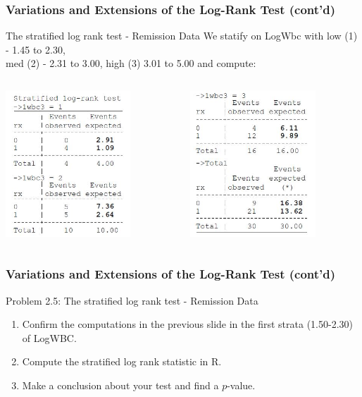\documentclass{beamer}
\theoremstyle{definition}
\begin{document}
\begin{frame}
\frametitle{Variations and Extensions of the Log-Rank Test (cont'd)}
\begin{block}{The stratified log rank test - Remission Data}
We statify on LogWbc with low (1) - 1.45 to 2.30, \\ med (2) - 2.31 to 3.00, high (3) 3.01 to 5.00 and compute:
\begin{columns}
    \begin{column}{0.48\textwidth}
        \includegraphics[width =\textwidth, height=5.5cm]{strat_lr1.JPG}
    \end{column}
    \hspace{-10pt}
    \begin{column}{0.48\textwidth}
         \includegraphics[width =\textwidth, height=5.5cm]{strat_lr2.JPG}
    \end{column}
\end{columns}
\end{block}
\end{frame}

\begin{frame}
\frametitle{Variations and Extensions of the Log-Rank Test (cont'd)}
\begin{block}{Problem 2.5: The stratified log rank test - Remission Data}
\begin{enumerate}
\item Confirm the computations in the previous slide in the first strata (1.50-2.30) of LogWBC.
\item Compute the stratified log rank statistic in R.
\item Make a conclusion about your test and find a $p$-value.
\end{enumerate}
\end{block}
\end{frame}
\end{document}
